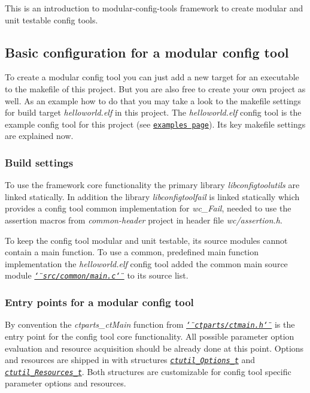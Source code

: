 This is an introduction to modular-\/config-\/tools framework to create modular and unit testable config tools.

\subsection*{Basic configuration for a modular config tool}

To create a modular config tool you can just add a new target for an executable to the makefile of this project. But you are also free to create your own project as well. As an example how to do that you may take a look to the makefile settings for build target {\itshape helloworld.\+elf} in this project. The {\itshape helloworld.\+elf} config tool is the example config tool for this project (see \href{examples.html}{\tt examples page}). Its key makefile settings are explained now.

\subsubsection*{Build settings}

To use the framework core functionality the primary library {\itshape libconfigtoolutils} are linked statically. In addition the library {\itshape libconfigtoolfail} is linked statically which provides a config tool common implementation for {\itshape wc\+\_\+\+Fail}, needed to use the assertion macros from {\itshape common-\/header} project in header file {\itshape wc/assertion.\+h}.

To keep the config tool modular and unit testable, its source modules cannot contain a main function. To use a common, predefined main function implementation the {\itshape helloworld.\+elf} config tool added the common main source module \href{main_8c.html}{\tt {\itshape \char`\"{}src/common/main.\+c\char`\"{}}} to its source list.

\subsubsection*{Entry points for a modular config tool}

By convention the {\itshape ctparts\+\_\+ct\+Main} function from \href{ctmain_8h.html}{\tt {\itshape \char`\"{}ctparts/ctmain.\+h\char`\"{}}} is the entry point for the config tool core functionality. All possible parameter option evaluation and resource acquisition should be already done at this point. Options and resources are shipped in with structures \href{structctutil__Options.html}{\tt {\itshape ctutil\+\_\+\+Options\+\_\+t}} and \href{structctutil__Resources.html}{\tt {\itshape ctutil\+\_\+\+Resources\+\_\+t}}. Both structures are customizable for config tool specific parameter options and resources.

